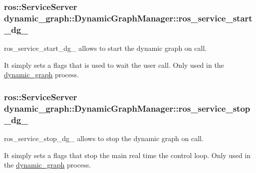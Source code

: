 \subsubsection[{\texorpdfstring{ros\+\_\+service\+\_\+start\+\_\+dg\+\_\+}{ros_service_start_dg_}}]{\setlength{\rightskip}{0pt plus 5cm}ros\+::\+Service\+Server dynamic\+\_\+graph\+::\+Dynamic\+Graph\+Manager\+::ros\+\_\+service\+\_\+start\+\_\+dg\+\_\+\hspace{0.3cm}{\ttfamily [protected]}}\hypertarget{classdynamic__graph_1_1DynamicGraphManager_adb99ba3a7a5e677b30531a69bcc922ec}{}\label{classdynamic__graph_1_1DynamicGraphManager_adb99ba3a7a5e677b30531a69bcc922ec}


ros\+\_\+service\+\_\+start\+\_\+dg\+\_\+ allows to start the dynamic graph on call. 

It simply sets a flags that is used to wait the user call. Only used in the \hyperlink{namespacedynamic__graph}{dynamic\+\_\+graph} process. 
\subsubsection[{\texorpdfstring{ros\+\_\+service\+\_\+stop\+\_\+dg\+\_\+}{ros_service_stop_dg_}}]{\setlength{\rightskip}{0pt plus 5cm}ros\+::\+Service\+Server dynamic\+\_\+graph\+::\+Dynamic\+Graph\+Manager\+::ros\+\_\+service\+\_\+stop\+\_\+dg\+\_\+\hspace{0.3cm}{\ttfamily [protected]}}\hypertarget{classdynamic__graph_1_1DynamicGraphManager_adf973b6da4e4fe14cae262ba94ebb191}{}\label{classdynamic__graph_1_1DynamicGraphManager_adf973b6da4e4fe14cae262ba94ebb191}


ros\+\_\+service\+\_\+stop\+\_\+dg\+\_\+ allows to stop the dynamic graph on call. 

It simply sets a flags that stop the main real time the control loop. Only used in the \hyperlink{namespacedynamic__graph}{dynamic\+\_\+graph} process. 
